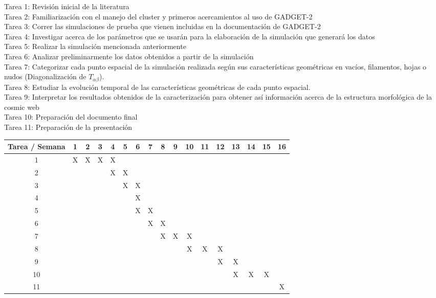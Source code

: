 \documentclass{article}
\begin{document}
Tarea 1: Revisión inicial de la literatura \\
Tarea 2: Familiarización con el manejo del cluster y primeros acercamientos al uso de GADGET-2 \\
Tarea 3: Correr las simulaciones de prueba que vienen incluidas en la documentación de GADGET-2  \\
Tarea 4: Investigar acerca de los parámetros que se usarán para la elaboración de la simulación que generará los datos \\
Tarea 5: Realizar la simulación mencionada anteriormente \\
Tarea 6: Analizar preliminarmente los datos obtenidos a partir de la simulación \\
Tarea 7: Categorizar cada punto espacial de la simulación realizada según sus características geométricas en vacíos, filamentos, hojas o nudos (Diagonalización de $T_{\alpha\beta}$). \\
Tarea 8: Estudiar la evolución temporal de las características geométricas de cada punto espacial. \\
Tarea 9: Interpretar los resultados obtenidos de la caracterización para obtener así información acerca de la estructura morfológica de la cosmic web \\
Tarea 10: Preparación del documento final \\
Tarea 11: Preparación de la presentación \\


\begin{table}[h]

\begin{tabular}{|c||c|c|c|c|c|c|c|c|c|c|c|c|c|c|c|c|}

\hline
Tarea / Semana & 1 & 2 & 3 & 4 & 5 & 6 & 7 & 8 & 9 & 10 & 11 & 12 & 13 & 14 & 15 & 16  \\
\hline\hline
1 & X & X & X & X &   &   &   &   &   &   &   &   &   &   &   &  \\
\hline
2 &   &  &  & X & X &   &   &   &   &   &   &   &   &   &   &  \\
\hline
3 &   &   &   &   & X & X &  &   &   &   &   &   &   &   &   &  \\
\hline
4 &   &   &   &   &   & X &  &  &   &   &   &   &   &   &   &  \\
\hline
5 &   &   &   &   &   & X & X &  &  &   &   &   &   &   &   &  \\
\hline
6 &   &   &   &   &   &   & X & X &   &   &   &   &   &   &   &  \\
\hline
7 &   &   &   &   &   &   &  & X & X & X &  &  &  &   &   &  \\
\hline
8 &   &   &   &   &   &   &   &   &   & X & X & X &  &   &   &  \\
\hline
9 &   &   &   &   &   &   &   &   &   &   &   & X & X &  &  &  \\
\hline
10 &   &   &   &   &   &   &   &   &   &   &   &   & X & X & X & \\
\hline
11 &   &   &   &   &   &   &   &   &   &   &   &   &   &   &  & X\\
\hline


\end{tabular}

\end{table}
\end{document}

